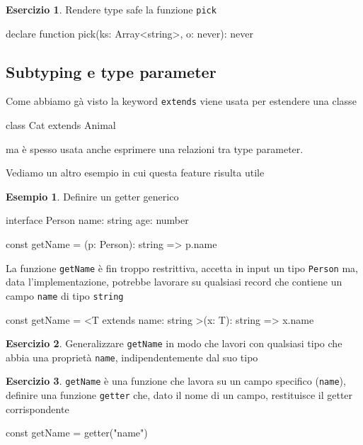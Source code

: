 \documentclass[12pt]{article}
\theoremstyle{definition}
\newtheorem{example}{Esempio}[subsection]
\newtheorem{exercise}{Esercizio}[subsection]
\newenvironment{code}
  {\vspace{0.5cm} \VerbatimEnvironment\begin{typescriptcode}}
  {\end{typescriptcode} \vspace{0.2cm}}
\begin{document}
\begin{exercise}
Rendere type safe la funzione \texttt{pick}

\begin{code}
declare function pick(ks: Array<string>, o: never): never
\end{code}
\end{exercise}

\subsection{Subtyping e type parameter}

Come abbiamo gà visto la keyword \texttt{extends} viene usata per estendere una classe

\begin{code}
class Cat extends Animal {}
\end{code}

ma è spesso usata anche esprimere una relazioni tra type parameter.

Vediamo un altro esempio in cui questa feature risulta utile

\begin{example}
Definire un getter generico

\begin{code}
interface Person {
  name: string
  age: number
}

const getName = (p: Person): string => p.name
\end{code}

La funzione \texttt{getName} è fin troppo restrittiva, accetta in input un tipo \texttt{Person} ma, data l'implementazione,
potrebbe lavorare su qualsiasi record che contiene un campo \texttt{name} di tipo \texttt{string}

\begin{code}
const getName = <T extends { name: string }>(x: T): string =>
  x.name
\end{code}
\end{example}

\begin{exercise}
Generalizzare \texttt{getName} in modo che lavori con qualsiasi tipo che abbia una proprietà \texttt{name},
indipendentemente dal suo tipo
\end{exercise}

\begin{exercise}
\texttt{getName} è una funzione che lavora su un campo specifico (\texttt{name}), definire
una funzione \texttt{getter} che, dato il nome di un campo, restituisce il getter corrispondente

\begin{code}
const getName = getter("name")
\end{code}
\end{exercise}
\end{document}
